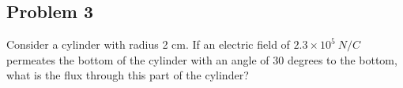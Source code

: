 \documentclass{article}
\begin{document}
	\subsection{Problem 3}
	
	Consider a cylinder with radius 2 cm. If an electric field of $2.3 \times 10^5 \ N/C$ permeates the bottom of the cylinder with an angle of 30 degrees to the bottom, what is the flux through this part of the cylinder?
	
	
	
	
	
	
	
	
	
	
	
\end{document}

